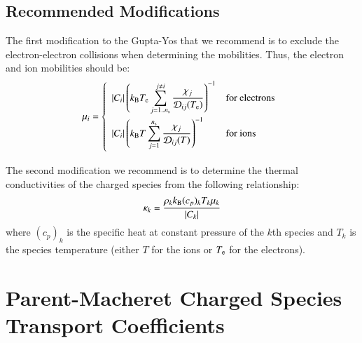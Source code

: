 \documentclass{warpdoc}
\newcommand{\alb}{\vspace{0.1cm}\\} %
\newcommand{\mfd}{\displaystyle}
\begin{document}
\subsection{Recommended Modifications}

The first modification to the Gupta-Yos that we recommend is to exclude the electron-electron collisions when determining the mobilities. Thus, the electron and ion mobilities should be:
%
\begin{equation}
 \mu_i= \left\{\begin{array}{ll}
   \mfd  |C_i| \left( k_{\rm B} T_{\rm e} \sum_{j=1..n_{\rm s}}^{j\neq i} \frac{\chi_j}{{\cal D}_{ij}(T_{\rm e})}\right)^{-1} & \textrm{for electrons} \alb
    \mfd  |C_i| \left( k_{\rm B} T \sum_{j=1}^{n_{\rm s}} \frac{\chi_j}{{\cal D}_{ij}(T)}\right)^{-1} & \textrm{for ions} \alb
 \end{array} \right.
\end{equation}
%

The second modification we recommend is to determine the thermal conductivities of the charged species from the following relationship:
%
\begin{equation}
  \kappa_k = \frac{\rho_k k_{\rm B} (c_p)_k T_k \mu_k}{|C_k|}    
\end{equation}
%
where $(c_p)_k$ is the specific heat at constant pressure of the $k$th species and $T_k$ is the species temperature (either $T$ for the ions or $T_{\rm e}$ for the electrons).










\section{Parent-Macheret Charged Species Transport Coefficients}
\end{document}
